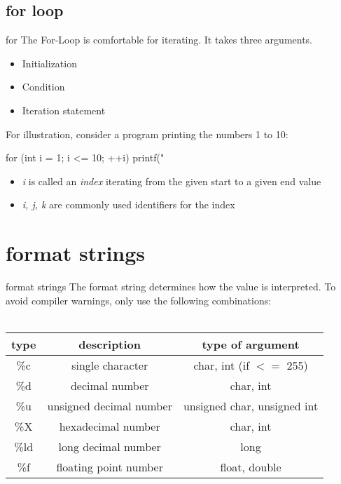 \documentclass[10pt,graphics,aspectratio=169,table]{beamer}
\begin{document}
\subsection{for loop}

\begin{frame}[fragile]{for}
    The For-Loop is comfortable for iterating. It takes three arguments.
    \begin{itemize}
        \item Initialization
        \item Condition
        \item Iteration statement
    \end{itemize}
    \bigskip
    For illustration, consider a program printing the numbers 1 to 10:
    \begin{codeblock}
for (int i = 1; i <= 10; ++i){
    printf("%
}
\end{codeblock}
    \begin{itemize}
        \item \textit{i} is called an \textit{index} iterating from the given start to a given end value
        \item \textit{i, j, k} are commonly used identifiers for the index
    \end{itemize}
\end{frame}


\section{format strings}
\begin{frame}{format strings}
The format string determines how the value is interpreted.
    To avoid compiler warnings, only use the following combinations: \\ \ \\
    \begin{tabular}{|c|c|c|}
        \hline
        \textbf{type} & \textbf{description} & \textbf{type of argument} \\\hline
        \%c & single character & char, int (if $<=$ 255) \\\hline
        \%d & decimal number & char, int \\\hline
        \%u & unsigned decimal number & unsigned char, unsigned int \\\hline
        \%X & hexadecimal number & char, int \\\hline
        \%ld & long decimal number & long \\\hline
        \%f & floating point number & float, double \\\hline
    \end{tabular}
\end{frame}
\end{document}
